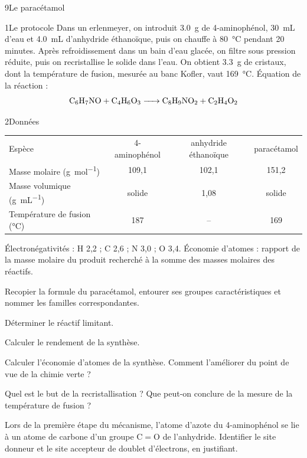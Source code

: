 \begin{exoBac}{9}{Le paracétamol}
\begin{docu}{1}{Le protocole}
Dans un erlenmeyer, on introduit \qty{3,0}{g} de 4-aminophénol, \qty{30}{mL} d'eau et \qty{4,0}{mL} d'anhydride éthanoïque, puis on chauffe à
\qty{80}{\degreeCelsius} pendant 20 minutes. Après refroidissement dans un bain d'eau glacée, on filtre sous pression réduite, puis on
recristallise le solide dans l'eau. On obtient \qty{3,3}{g} de cristaux, dont la température de fusion, mesurée au banc
Kofler, vaut \qty{169}{\degreeCelsius}. Équation de la réaction :
\[\ce{C6H7NO + C4H6O3 -> C8H9NO2 + C2H4O2}\]
\end{docu}
\begin{docu}{2}{Données}
{\small\begin{tabular}{@{}lccc@{}}
Espèce & 4-aminophénol & anhydride éthanoïque & paracétamol \\
Masse molaire (\unit{g.mol^{-1}}) & 109,1 & 102,1 & 151,2 \\
Masse volumique (\unit{g.mL^{-1}}) & solide & 1,08 & solide \\
Température de fusion (\unit{\degreeCelsius}) & 187 & -- & 169 \\
\end{tabular}}\par\smallskip
Électronégativités : H 2,2 ; C 2,6 ; N 3,0 ; O 3,4. Économie d'atomes : rapport de la masse molaire du produit recherché à
la somme des masses molaires des réactifs.
\end{docu}
\begin{questions}
\item Recopier la formule du paracétamol, entourer ses groupes caractéristiques et nommer les familles correspondantes.
\item Déterminer le réactif limitant.
\item Calculer le rendement de la synthèse.
\item Calculer l'économie d'atomes de la synthèse. Comment l'améliorer du point de vue de la chimie verte ?
\item Quel est le but de la recristallisation ? Que peut-on conclure de la mesure de la température de fusion ?
\item Lors de la première étape du mécanisme, l'atome d'azote du 4-aminophénol se lie à un atome de carbone d'un groupe
C$=$O de l'anhydride. Identifier le site donneur et le site accepteur de doublet d'électrons, en justifiant.
\end{questions}


\end{exoBac}
